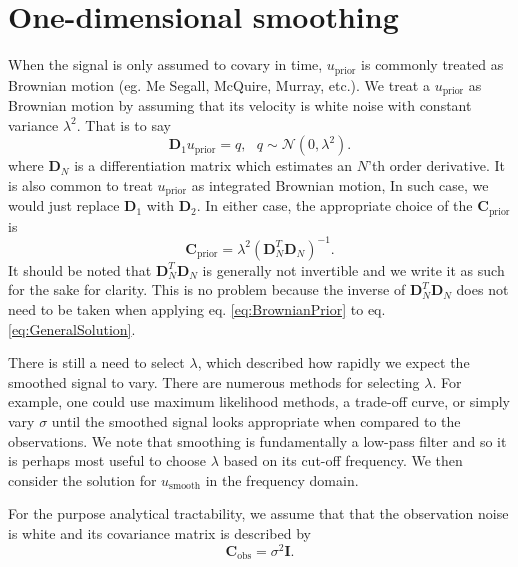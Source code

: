 \documentclass[10pt,a4paper]{article}
\begin{document}
\section*{One-dimensional smoothing}
When the signal is only assumed to covary in time, $u_\mathrm{prior}$ is commonly treated as Brownian motion (eg. Me Segall, McQuire, Murray, etc.).  We treat a $u_\mathrm{prior}$ as Brownian motion by assuming that its velocity is white noise with constant variance $\lambda^2$. That is to say
\begin{equation}
  \mathbf{D}_1 u_\mathrm{prior} = q, \ \ \ q \sim \mathcal{N}(0,\lambda^2).
\end{equation}     
where $\mathbf{D}_N$ is a differentiation matrix which estimates an $N$'th order derivative. It is also common to treat $u_\mathrm{prior}$ as integrated Brownian motion, In such case, we would just replace $\mathbf{D}_1$ with $\mathbf{D}_2$. In either case, the appropriate choice of the $\mathbf{C}_\mathrm{prior}$ is   
\begin{equation}\label{eq:BrownianPrior}
\mathbf{C_\mathrm{prior}} = \lambda^2(\mathbf{D}_N^T\mathbf{D}_N)^{-1}.
\end{equation}
It should be noted that $\mathbf{D}_N^T\mathbf{D}_N$ is generally not invertible and we write it as such for the sake for clarity.  This is no problem because the inverse of $\mathbf{D}_N^T\mathbf{D}_N$ does not need to be taken when applying eq. \ref{eq:BrownianPrior} to eq. \ref{eq:GeneralSolution}.       

There is still a need to select $\lambda$, which described how rapidly we expect the smoothed signal to vary.  There are numerous methods for selecting $\lambda$.  For example, one could use maximum likelihood methods, a trade-off curve, or simply vary $\sigma$ until the smoothed signal looks appropriate when compared to the observations.  We note that smoothing is fundamentally a low-pass filter and so it is perhaps most useful to choose $\lambda$ based on its cut-off frequency.  We then consider the solution for $u_\mathrm{smooth}$ in the frequency domain.  

For the purpose analytical tractability, we assume that that the observation noise is white and its covariance matrix is described by
\begin{equation}
\mathbf{C}_\mathrm{obs} = \sigma^2 \mathbf{I}.
\end{equation}  
\end{document}
